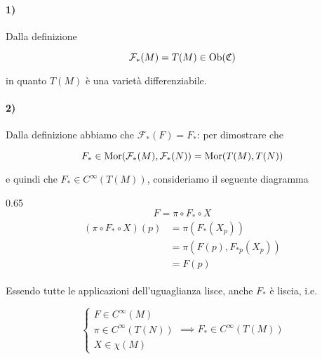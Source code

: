 {\paragraph{1)}

Dalla definizione

\begin{equation}
	\mathcal{F}_{*}(M) = T(M) \in \operatorname{Ob}(\mathfrak{C})
\end{equation}

in quanto $ T(M) $ è una varietà differenziabile.

\paragraph{2)}

Dalla definizione abbiamo che $ \mathcal{F}_{*}(F) = F_{*} $: per dimostrare che

\begin{equation}
	F_{*} \in \operatorname{Mor}(\mathcal{F}_{*}(M),\mathcal{F}_{*}(N)) = \operatorname{Mor}(T(M),T(N))
\end{equation}

e quindi che $ F_{*} \in C^{\infty}(T(M)) $, consideriamo il seguente diagramma

	{0.65}{%
			\begin{equation}
				F = \pi \circ F_{*} \circ X
			\end{equation}
			\begin{align}
				\begin{split}
					(\pi \circ F_{*} \circ X)(p) &= \pi (F_{*} (X_{p})) \\
					&= \pi(F(p), F_{*p}(X_{p})) \\
					&= F(p)
				\end{split}
			\end{align}
			}

Essendo tutte le applicazioni dell'uguaglianza lisce, anche $ F_{*} $ è liscia, i.e.

\begin{equation}
	\begin{cases}
		F \in C^{\infty}(M) \\
		\pi \in C^{\infty}(T(N)) \\
		X \in \chi(M)
	\end{cases} %
	\implies %
	F_{*} \in C^{\infty}(T(M))
\end{equation}

}
